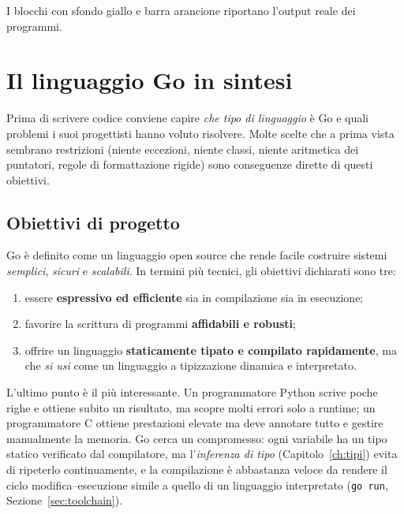 \documentclass[11pt,a4paper]{report}
\newcommand{\cod}[1]{\texttt{#1}}
\begin{document}
I blocchi con sfondo giallo e barra arancione riportano l'output reale dei programmi.

\chapter{Il linguaggio Go in sintesi}\label{ch:go}

Prima di scrivere codice conviene capire \emph{che tipo di linguaggio} è Go e
quali problemi i suoi progettisti hanno voluto risolvere. Molte scelte che a
prima vista sembrano restrizioni (niente eccezioni, niente classi, niente
aritmetica dei puntatori, regole di formattazione rigide) sono conseguenze
dirette di questi obiettivi.

\section{Obiettivi di progetto}

Go è definito come un linguaggio open source che rende facile costruire sistemi
\emph{semplici}, \emph{sicuri} e \emph{scalabili}. In termini più tecnici, gli
obiettivi dichiarati sono tre:

\begin{enumerate}
  \item essere \textbf{espressivo ed efficiente} sia in compilazione sia in
        esecuzione;
  \item favorire la scrittura di programmi \textbf{affidabili e robusti};
  \item offrire un linguaggio \textbf{staticamente tipato e compilato
        rapidamente}, ma che \emph{si usi} come un linguaggio a tipizzazione
        dinamica e interpretato.
\end{enumerate}

L'ultimo punto è il più interessante. Un programmatore Python scrive poche
righe e ottiene subito un risultato, ma scopre molti errori solo a runtime; un
programmatore C ottiene prestazioni elevate ma deve annotare tutto e gestire
manualmente la memoria. Go cerca un compromesso: ogni variabile ha un tipo
statico verificato dal compilatore, ma l'\emph{inferenza di tipo} (Capitolo~\ref{ch:tipi})
evita di ripeterlo continuamente, e la compilazione è abbastanza veloce da
rendere il ciclo modifica--esecuzione simile a quello di un linguaggio interpretato
(\cod{go run}, Sezione~\ref{sec:toolchain}).
\end{document}
